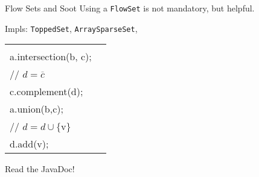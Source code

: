 \begin{slide}{Flow Sets and Soot}
\vspace*{-0.1in}
Using a {\tt FlowSet} is not mandatory, but helpful.

\quad

Impls: {\tt ToppedSet}, {\tt ArraySparseSet}, \\
\qquad {}

\quad

\begin{tabular}{ll}
\begin{minipage}{0.5\textwidth}
{\small \tt 
// $c = a \cap b$ \\
a.intersection(b, c); \\

// $d = \overline{c}$\\
c.complement(d);
}
\end{minipage} &
\begin{minipage}{0.3\textwidth}
{\small \tt
// $c = a \cup b$ \\
a.union(b,c);\\

// $d = d \cup \{ \mbox{v} \}$\\
d.add(v);
}
\end{minipage}

\end{tabular}

\quad

\begin{center}
Read the JavaDoc!
\end{center}
\end{slide}

